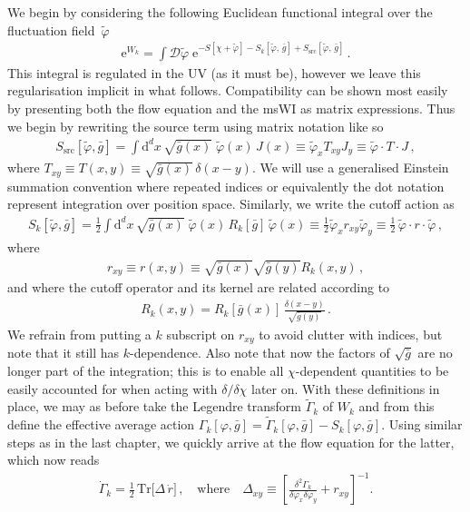 \documentclass[11pt]{book}
\numberwithin{equation}{chapter}
\begin{document}
We begin by considering the following Euclidean functional integral over the fluctuation field~$\tilde\varphi$
\begin{align}
  \mathrm e^{W_k} = \int \mathcal{D}\tilde\varphi \;
  \mathrm e^{-S[\chi+\tilde\varphi]-S_k[\tilde\varphi,\, \bar g]
  + S_{\mathrm{src}}[\tilde\varphi, \, \bar g]} \,.
  \label{Z}
\end{align}
This integral is regulated in the UV (as it must be), however we leave this regularisation implicit
in what follows. Compatibility can be shown most easily by presenting both the flow equation and the
msWI as matrix expressions. Thus we begin by rewriting the source term using matrix notation like so
\begin{align}
	S_\mathrm{src}[\tilde\varphi,\bar g] = \int \mathrm d^d x \, \sqrt{\bar g(x)} \;
  \tilde\varphi(x) \, J(x)
  \equiv \tilde\varphi_xT_{xy}J_y
  \equiv \tilde\varphi\cdot T\cdot J \,,
\end{align}
where $T_{xy}\equiv T(x,y)\equiv\sqrt{\bar g(x)} \, \delta(x-y)$. We will use a generalised
Einstein summation convention where repeated indices or equivalently the dot notation represent
integration over position space. Similarly, we write the cutoff action as
\begin{align}
  S_k[\tilde\varphi, \bar g] = \frac{1}{2} \int \mathrm d^d x \, \sqrt{\bar g(x)} \;
  \tilde\varphi(x) \, R_k[\bar g] \, \tilde\varphi(x)
  \equiv \frac{1}{2}\tilde\varphi_x r_{xy} \tilde\varphi_{y}
  \equiv\frac{1}{2}\,\tilde\varphi\cdot r \cdot\tilde\varphi \,,
  \label{cutoff-action}
\end{align}
where
\begin{align}
  r_{xy}\equiv r(x,y)\equiv\sqrt{\bar g(x)}\sqrt{\bar g(y)}R_{k}(x,y)\,,
  \label{odd-r}
\end{align}
and where the cutoff operator and its kernel are related according to
\begin{align}
  R_k(x,y) = R_{k}[\bar g(x)] \, \frac{\delta(x-y)}{\sqrt{\bar g(y)}} \,.
\end{align}
We refrain from putting a $k$ subscript on $r_{xy}$ to avoid clutter with indices,
but note that it still has $k$-dependence. Also note that now the factors of $\sqrt{\bar g}$ are no
longer part of the integration; this is to enable all $\chi$-dependent quantities to be easily accounted
for when acting with $\delta/\delta\chi$ later on.
With these definitions in place, we may as before take the Legendre transform $\tilde\Gamma_{k}$ of $W_k$
and from this define the effective average action
$ \Gamma_k[\varphi,\bar g]=\tilde\Gamma_k[\varphi,\bar g]-S_k[\varphi,\bar g]$.
Using similar steps as in the last chapter, we quickly arrive at the flow equation
for the latter, which now reads
\begin{align}
  \dot \Gamma_k =
  \frac{1}{2} \, \mathrm{Tr} \big[ \Delta \, \dot r \big] \,,
  \quad \text{where} \quad
  \Delta_{xy}\equiv\left[\frac{\delta^{2}\Gamma_k}{\delta\varphi_x \delta\varphi_y}+r_{xy}\right]^{-1} .
  \label{flow1}
\end{align}
\end{document}
